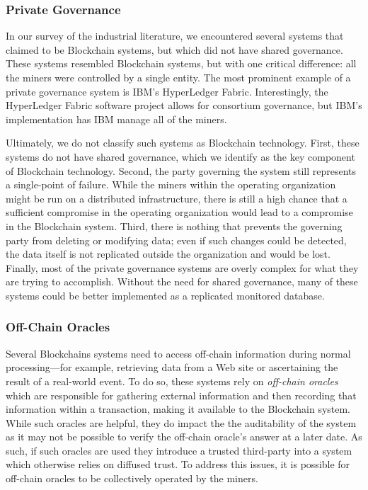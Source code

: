 \subsubsection{Private Governance}
In our survey of the industrial literature, we encountered several systems that claimed to be Blockchain systems, but which did not have shared governance.
These systems resembled Blockchain systems, but with one critical difference: all the miners were controlled by a single entity.
The most prominent example of a private governance system is IBM's HyperLedger Fabric.
Interestingly, the HyperLedger Fabric software project allows for consortium governance, but IBM's implementation has IBM manage all of the miners.

Ultimately, we do not classify such systems as Blockchain technology.
First, these systems do not have shared governance, which we identify as the key component of Blockchain technology.
Second, the party governing the system still represents a single-point of failure.
While the miners within the operating organization might be run on a distributed infrastructure, there is still a high chance that a sufficient compromise in the operating organization would lead to a compromise in the Blockchain system.
Third, there is nothing that prevents the governing party from deleting or modifying data; even if such changes could be detected, the data itself is not replicated outside the organization and would be lost.
Finally, most of the private governance systems are overly complex for what they are trying to accomplish.
Without the need for shared governance, many of these systems could be better implemented as a replicated monitored database.

\subsubsection{Off-Chain Oracles}
Several Blockchains systems need to access off-chain information during normal processing---for example, retrieving data from a Web site or ascertaining the result of a real-world event.
To do so, these systems rely on \emph{off-chain oracles} which are responsible for gathering external information and then recording that information within a transaction, making it available to the Blockchain system.
While such oracles are helpful, they do impact the the auditability of the system as it may not be possible to verify the off-chain oracle's answer at a later date.
As such, if such oracles are used they introduce a trusted third-party into a system which otherwise relies on diffused trust.
To address this issues, it is possible for off-chain oracles to be collectively operated by the miners.

